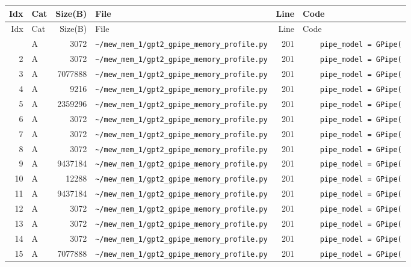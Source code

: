 \documentclass{article}
\begin{document}
\begin{longtable}{r l r p{6.5cm} r p{7.0cm}}
\hline
Idx & Cat & Size(B) & File & Line & Code \\
\hline
\endfirsthead
\hline
Idx & Cat & Size(B) & File & Line & Code \\
\hline
\endhead
\hline
\endfoot
1 & A & 3072 & \lstinline|~/mew_mem_1/gpt2_gpipe_memory_profile.py| & 201 & \lstinline|    pipe_model = GPipe(| \\
2 & A & 3072 & \lstinline|~/mew_mem_1/gpt2_gpipe_memory_profile.py| & 201 & \lstinline|    pipe_model = GPipe(| \\
3 & A & 7077888 & \lstinline|~/mew_mem_1/gpt2_gpipe_memory_profile.py| & 201 & \lstinline|    pipe_model = GPipe(| \\
4 & A & 9216 & \lstinline|~/mew_mem_1/gpt2_gpipe_memory_profile.py| & 201 & \lstinline|    pipe_model = GPipe(| \\
5 & A & 2359296 & \lstinline|~/mew_mem_1/gpt2_gpipe_memory_profile.py| & 201 & \lstinline|    pipe_model = GPipe(| \\
6 & A & 3072 & \lstinline|~/mew_mem_1/gpt2_gpipe_memory_profile.py| & 201 & \lstinline|    pipe_model = GPipe(| \\
7 & A & 3072 & \lstinline|~/mew_mem_1/gpt2_gpipe_memory_profile.py| & 201 & \lstinline|    pipe_model = GPipe(| \\
8 & A & 3072 & \lstinline|~/mew_mem_1/gpt2_gpipe_memory_profile.py| & 201 & \lstinline|    pipe_model = GPipe(| \\
9 & A & 9437184 & \lstinline|~/mew_mem_1/gpt2_gpipe_memory_profile.py| & 201 & \lstinline|    pipe_model = GPipe(| \\
10 & A & 12288 & \lstinline|~/mew_mem_1/gpt2_gpipe_memory_profile.py| & 201 & \lstinline|    pipe_model = GPipe(| \\
11 & A & 9437184 & \lstinline|~/mew_mem_1/gpt2_gpipe_memory_profile.py| & 201 & \lstinline|    pipe_model = GPipe(| \\
12 & A & 3072 & \lstinline|~/mew_mem_1/gpt2_gpipe_memory_profile.py| & 201 & \lstinline|    pipe_model = GPipe(| \\
13 & A & 3072 & \lstinline|~/mew_mem_1/gpt2_gpipe_memory_profile.py| & 201 & \lstinline|    pipe_model = GPipe(| \\
14 & A & 3072 & \lstinline|~/mew_mem_1/gpt2_gpipe_memory_profile.py| & 201 & \lstinline|    pipe_model = GPipe(| \\
15 & A & 7077888 & \lstinline|~/mew_mem_1/gpt2_gpipe_memory_profile.py| & 201 & \lstinline|    pipe_model = GPipe(| \\

\end{longtable}
\end{document}
